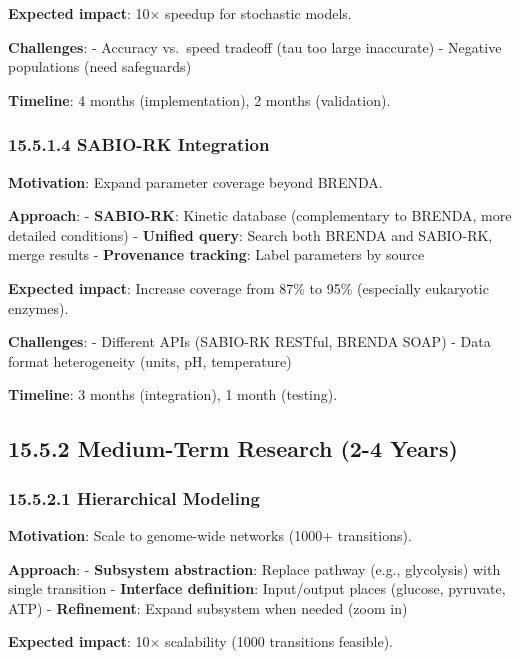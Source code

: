 \textbf{Expected impact}: 10× speedup for stochastic models.

\textbf{Challenges}: - Accuracy vs.~speed tradeoff (tau too large \textrightarrow
inaccurate) - Negative populations (need safeguards)

\textbf{Timeline}: 4 months (implementation), 2 months (validation).

\hypertarget{sabio-rk-integration}{%
\subsubsection{15.5.1.4 SABIO-RK
Integration}\label{sabio-rk-integration}}

\textbf{Motivation}: Expand parameter coverage beyond BRENDA.

\textbf{Approach}: - \textbf{SABIO-RK}: Kinetic database (complementary
to BRENDA, more detailed conditions) - \textbf{Unified query}: Search
both BRENDA and SABIO-RK, merge results - \textbf{Provenance tracking}:
Label parameters by source

\textbf{Expected impact}: Increase coverage from 87\% to 95\%
(especially eukaryotic enzymes).

\textbf{Challenges}: - Different APIs (SABIO-RK RESTful, BRENDA SOAP) -
Data format heterogeneity (units, pH, temperature)

\textbf{Timeline}: 3 months (integration), 1 month (testing).

\hypertarget{medium-term-research-2-4-years}{%
\subsection{15.5.2 Medium-Term Research (2-4
Years)}\label{medium-term-research-2-4-years}}

\hypertarget{hierarchical-modeling}{%
\subsubsection{15.5.2.1 Hierarchical
Modeling}\label{hierarchical-modeling}}

\textbf{Motivation}: Scale to genome-wide networks (1000+ transitions).

\textbf{Approach}: - \textbf{Subsystem abstraction}: Replace pathway
(e.g., glycolysis) with single transition - \textbf{Interface
definition}: Input/output places (glucose, pyruvate, ATP) -
\textbf{Refinement}: Expand subsystem when needed (zoom in)

\textbf{Expected impact}: 10× scalability (1000 transitions feasible).

